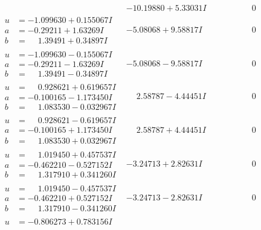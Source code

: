 \documentclass[1p]{elsarticle_modified}
\theoremstyle{definition}
\begin{document}
$$\begin{array}{c|c|c}
 & -10.19880 + 5.33031 I & \phantom{-0.000000 } 0 \\ \hline\begin{aligned}
u &= -1.099630 + 0.155067 I \\
a &= -0.29211 + 1.63269 I \\
b &= \phantom{-}1.39491 + 0.34897 I\end{aligned}
 & -5.08068 + 9.58817 I & \phantom{-0.000000 } 0 \\ \hline\begin{aligned}
u &= -1.099630 - 0.155067 I \\
a &= -0.29211 - 1.63269 I \\
b &= \phantom{-}1.39491 - 0.34897 I\end{aligned}
 & -5.08068 - 9.58817 I & \phantom{-0.000000 } 0 \\ \hline\begin{aligned}
u &= \phantom{-}0.928621 + 0.619657 I \\
a &= -0.100165 - 1.173450 I \\
b &= \phantom{-}1.083530 - 0.032967 I\end{aligned}
 & \phantom{-}2.58787 - 4.44451 I & \phantom{-0.000000 } 0 \\ \hline\begin{aligned}
u &= \phantom{-}0.928621 - 0.619657 I \\
a &= -0.100165 + 1.173450 I \\
b &= \phantom{-}1.083530 + 0.032967 I\end{aligned}
 & \phantom{-}2.58787 + 4.44451 I & \phantom{-0.000000 } 0 \\ \hline\begin{aligned}
u &= \phantom{-}1.019450 + 0.457537 I \\
a &= -0.462210 - 0.527152 I \\
b &= \phantom{-}1.317910 + 0.341260 I\end{aligned}
 & -3.24713 + 2.82631 I & \phantom{-0.000000 } 0 \\ \hline\begin{aligned}
u &= \phantom{-}1.019450 - 0.457537 I \\
a &= -0.462210 + 0.527152 I \\
b &= \phantom{-}1.317910 - 0.341260 I\end{aligned}
 & -3.24713 - 2.82631 I & \phantom{-0.000000 } 0 \\ \hline\begin{aligned}
u &= -0.806273 + 0.783156 I \\

\end{aligned}
\end{array}$$
\end{document}
